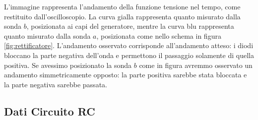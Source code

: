 \documentclass[a4paper]{article}
\begin{document}
L'immagine rappresenta l'andamento della funzione tensione nel tempo, come restituito dall'oscilloscopio. La curva gialla rappresenta quanto misurato dalla sonda $b$, posizionata ai capi del generatore, mentre la curva blu rappresenta quanto misurato dalla sonda $a$, posizionata come nello schema in figura \ref{fig:rettificatore}. L'andamento osservato corrisponde all'andamento atteso: i diodi bloccano la parte negativa dell'onda e permettono il passaggio solamente di quella positiva. Se avessimo posizionato la sonda $b$ come in figura avremmo osservato un andamento simmetricamente opposto: la parte positiva sarebbe stata bloccata e la parte negativa sarebbe passata.



\newpage

\begin{appendices}
\renewcommand{\thetable}{\thesection.\arabic{table}} %
\renewcommand{\thefigure}{\thesection.\arabic{figure}} %

\section{Dati Circuito RC} \label{app:dati_rc}
\setcounter{table}{0} %


\end{appendices}
\end{document}

